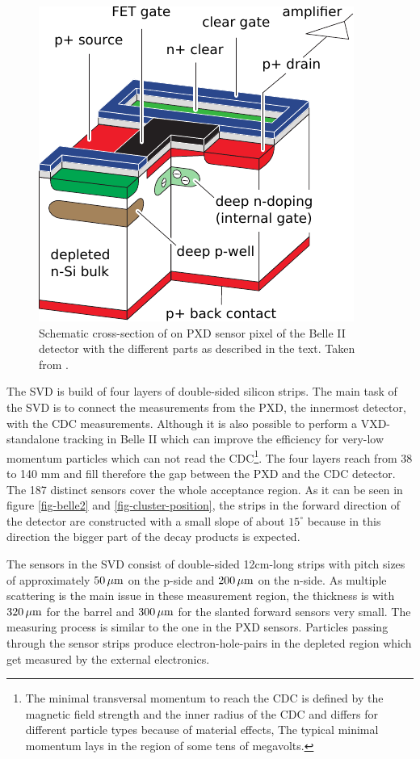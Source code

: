 \begin{figure}
  \centering
  \includegraphics[width=0.6\linewidth]{figures/experimental_setup/pxd.pdf}
  \caption[Cross-section of a PXD sensor]{Schematic cross-section of on PXD sensor pixel of the Belle II detector with the different parts as described in the text. Taken from \cite{tdr}.}
  \label{fig-pxd-schema}
\end{figure}


The SVD is build of four layers of double-sided silicon strips. The main task of the SVD is to connect the measurements from the PXD, the innermost detector, with the CDC measurements. Although it is also possible to perform a VXD-standalone tracking in Belle II which can improve the efficiency for very-low momentum particles which can not read the CDC\footnote{The minimal transversal momentum to reach the CDC is defined by the magnetic field strength and the inner radius of the CDC and differs for different particle types because of material effects, The typical minimal momentum lays in the region of some tens of megavolts.}. The four layers reach from 38 to 140 mm and fill therefore the gap between the PXD and the CDC detector. The 187 distinct sensors cover the whole acceptance region. As it can be seen in figure \ref{fig-belle2} and \ref{fig-cluster-position}, the strips in the forward direction of the detector are constructed with a small slope of about $15^\circ$ because in this direction the bigger part of the decay products is expected. 

The sensors in the SVD consist of double-sided 12cm-long strips with pitch sizes of approximately $\unit[50]{\mu m}$ on the p-side and $\unit[200]{\mu m}$ on the n-side. As multiple scattering is the main issue in these measurement region, the thickness is with $\unit[320]{\mu m}$ for the barrel and $\unit[300]{\mu m}$ for the slanted forward sensors very small. The measuring process is similar to the one in the PXD sensors. Particles passing through the sensor strips produce electron-hole-pairs in the depleted region which get measured by the external electronics. 
